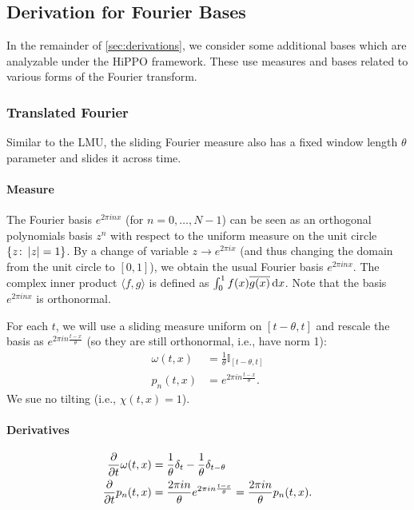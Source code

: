 \documentclass[../../hippo]{subfiles}
\begin{document}
\subsection{Derivation for Fourier Bases}
\label{sec:derivation-fourier}

In the remainder of \cref{sec:derivations}, we consider some additional bases which are analyzable under the HiPPO framework.
These use measures and bases related to various forms of the Fourier transform.

\subsubsection{Translated Fourier}

Similar to the LMU, the sliding Fourier measure also has a fixed window length
$\theta$ parameter and slides it across time.

\paragraph{Measure}
The Fourier basis $e^{2\pi i n x}$ (for $n = 0, \dots, N-1$) can be seen as an
orthogonal polynomials basis $z^n$ with respect to the uniform measure on the
unit circle $\{ z \colon \left\lvert z\right\rvert = 1 \}$.
By a change of variable $z \to e^{2\pi i x}$ (and thus changing the domain from the unit
circle to $[0, 1]$), we obtain the usual Fourier basis $e^{2\pi i n x}$.
The complex inner product $\langle f, g \rangle$ is defined as
$\int_{0}^{1} f(x) \overline{g(x)} \mathop{}\!\mathrm{d} x$.
Note that the basis $e^{2\pi i n x}$ is orthonormal.

For each $t$, we will use a sliding measure uniform on $[t - \theta, t]$ and rescale
the basis as $e^{2\pi i n \frac{t - x}{\theta}}$ (so they are still orthonormal, i.e.,
have norm 1):
\begin{align*}
  \omega(t, x) &= \frac{1}{\theta} \mathbb{I}_{[t-\theta, t]}
  \\
  p_n(t, x) &= e^{2\pi in \frac{t-x}{\theta}}.
\end{align*}
We sue no tilting (i.e., $\chi(t, x) = 1$).

\paragraph{Derivatives}
\begin{align*}
  \frac{\partial}{\partial t} \omega(t, x) &= \frac{1}{\theta} \delta_t - \frac{1}{\theta} \delta_{t-\theta}
  \\
  \frac{\partial}{\partial t} p_n(t, x) &= \frac{2\pi in}{\theta} e^{2\pi in \frac{t-x}{\theta}} = \frac{2 \pi in}{\theta} p_n(t, x).
\end{align*}
\end{document}
